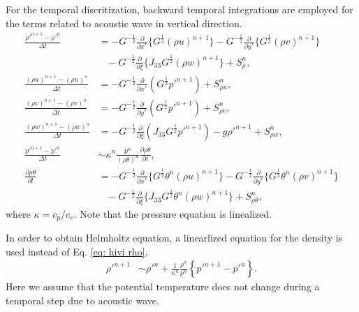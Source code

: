 For the temporal discritization, backward temporal integrations are employed for the terms related to acoustic wave in vertical direction.
\begin{align}
  \frac{\rho'^{n+1}-\rho'^n}{\Delta t} &=
  -G^{-\frac{1}{2}}\frac{\partial}{\partial x^*}\{G^{\frac{1}{2}}(\rho u)^{n+1}\}
  -G^{-\frac{1}{2}}\frac{\partial}{\partial y^*}\{G^{\frac{1}{2}}(\rho v)^{n+1}\} \nonumber\\ & \;\;\;
  -G^{-\frac{1}{2}}\frac{\partial}{\partial \xi}\{J_{33}G^{\frac{1}{2}}(\rho w)^{n+1}\}
  + S_\rho^n, \label{eq: hivi rho} \\
  \frac{(\rho u)^{n+1}-(\rho u)^n}{\Delta t}
  &= -G^{-\frac{1}{2}}\frac{\partial}{\partial x^*}(G^{\frac{1}{2}}p'^{n+1}) + S_{\rho u}^n, \\
  \frac{(\rho v)^{n+1}-(\rho v)^n}{\Delta t}
  &= -G^{-\frac{1}{2}}\frac{\partial}{\partial y^*}(G^{\frac{1}{2}}p'^{n+1}) + S_{\rho v}^n, \\
  \frac{(\rho w)^{n+1}-(\rho w)^n}{\Delta t}
  &= -G^{-\frac{1}{2}}\frac{\partial}{\partial \xi}(J_{33}G^{\frac{1}{2}}p'^{n+1}) -g\rho'^{n+1} + S_{\rho w}^n, \\
  \frac{p'^{n+1} - p'^n}{\Delta t}
  &\sim \kappa^n \frac{p^n}{(\rho\theta)^n}\frac{\partial \rho\theta}{\partial t}, \\
  \frac{\partial \rho\theta}{\partial t} &=
  -G^{-\frac{1}{2}}\frac{\partial}{\partial x^*}\{G^{\frac{1}{2}}\theta^n (\rho u)^{n+1}\}
  -G^{-\frac{1}{2}}\frac{\partial}{\partial y^*}\{G^{\frac{1}{2}}\theta^n (\rho v)^{n+1}\}  \nonumber\\ & \;\;\;
  -G^{-\frac{1}{2}}\frac{\partial}{\partial \xi}\{J_{33}G^{\frac{1}{2}}\theta^n (\rho w)^{n+1}\}
  + S_{\rho\theta}^n,
\end{align}
where $\kappa = c_p/c_v$.
Note that the pressure equation is linealized.

In order to obtain Helmholtz equation, a linearlized equation for the density is used instead of Eq. \ref{eq: hivi rho}.
\begin{align}
  \rho'^{n+1} &\sim
  \rho'^n + \frac{1}{\kappa^n} \frac{\rho^n}{p^n} \left\{p'^{n+1}-p'^n\right\}.
\end{align}
Here we assume that the potential temperature does not change during a temporal step due to acoustic wave.

